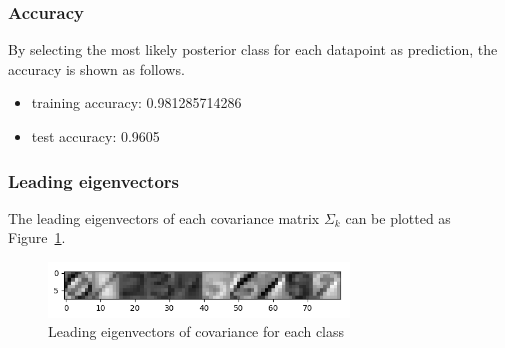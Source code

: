 \documentclass[a4paper]{article}
\begin{document}
\subsubsection{Accuracy}

By selecting the most likely posterior class for each datapoint as prediction, the accuracy is shown as follows.

\begin{itemize}
    \item training accuracy: 0.981285714286
    \item test accuracy: 0.9605
\end{itemize}

\subsubsection{Leading eigenvectors}

The leading eigenvectors of each covariance matrix $\Sigma_k$ can be plotted as Figure~\ref{fig: Leading_eigenvectors}.

\begin{figure}[htbp]
\centering
\includegraphics[width = 8cm]{Leading_eigenvectors}
\caption{Leading eigenvectors of covariance for each class}
\label{fig: Leading_eigenvectors}
\end{figure}




\end{document}
